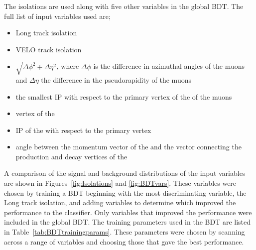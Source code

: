 The isolations are used along with five other variables in the global BDT. The full list of input variables used are;
\begin{itemize}
\item Long track isolation
\item VELO track isolation
\item $\sqrt{\Delta \phi^{2} + \Delta \eta^{2}}$, where $\Delta \phi$ is the difference in azimuthal angles of the muons and $\Delta \eta$ the difference in the pseudorapidity of the muons
\item the smallest IP \chisqd with respect to the primary vertex of the \bsmumu of the muons
\item vertex \chisqd of the \bs
\item IP \chisqd of the \bs with respect to the primary vertex
\item angle between the momentum vector of the \bs and the vector connecting the production and decay vertices of the \bs
\end{itemize}

A comparison of the signal and background distributions of the input variables are shown in Figures~\ref{fig:Isolations} and \ref{fig:BDTvars}. These variables were chosen by training a BDT beginning with the most discriminating variable, the Long track isolation, and adding variables to determine which improved the performance to the classifier. Only variables that improved the performance were included in the global BDT. The training parameters used in the BDT are listed in Table~\ref{tab:BDTtrainingparams}. These parameters were chosen by scanning across a range of variables and choosing those that gave the best performance. 

